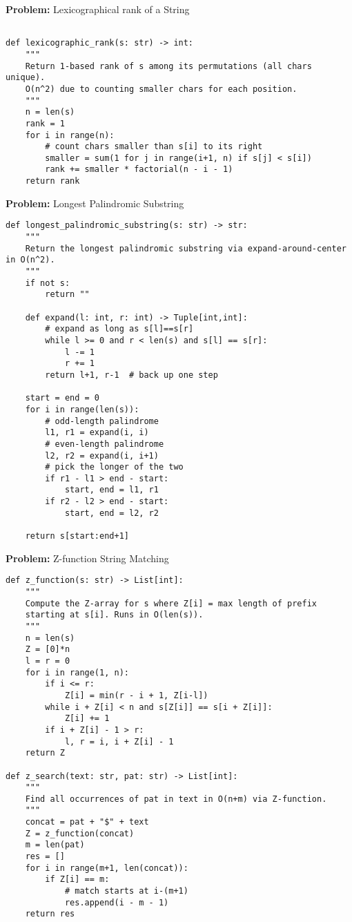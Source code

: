 \noindent\textbf{Problem:} Lexicographical rank of a String
\begin{verbatim}

def lexicographic_rank(s: str) -> int:
    """
    Return 1-based rank of s among its permutations (all chars unique).
    O(n^2) due to counting smaller chars for each position.
    """
    n = len(s)
    rank = 1
    for i in range(n):
        # count chars smaller than s[i] to its right
        smaller = sum(1 for j in range(i+1, n) if s[j] < s[i])
        rank += smaller * factorial(n - i - 1)
    return rank
\end{verbatim}
\noindent\textbf{Problem:} Longest Palindromic Substring
\begin{verbatim}
def longest_palindromic_substring(s: str) -> str:
    """
    Return the longest palindromic substring via expand‐around‐center in O(n^2).
    """
    if not s:
        return ""

    def expand(l: int, r: int) -> Tuple[int,int]:
        # expand as long as s[l]==s[r]
        while l >= 0 and r < len(s) and s[l] == s[r]:
            l -= 1
            r += 1
        return l+1, r-1  # back up one step

    start = end = 0
    for i in range(len(s)):
        # odd-length palindrome
        l1, r1 = expand(i, i)
        # even-length palindrome
        l2, r2 = expand(i, i+1)
        # pick the longer of the two
        if r1 - l1 > end - start:
            start, end = l1, r1
        if r2 - l2 > end - start:
            start, end = l2, r2

    return s[start:end+1]

\end{verbatim}
\noindent\textbf{Problem:} Z-function String Matching
\begin{verbatim}
def z_function(s: str) -> List[int]:
    """
    Compute the Z-array for s where Z[i] = max length of prefix
    starting at s[i]. Runs in O(len(s)).
    """
    n = len(s)
    Z = [0]*n
    l = r = 0
    for i in range(1, n):
        if i <= r:
            Z[i] = min(r - i + 1, Z[i-l])
        while i + Z[i] < n and s[Z[i]] == s[i + Z[i]]:
            Z[i] += 1
        if i + Z[i] - 1 > r:
            l, r = i, i + Z[i] - 1
    return Z

def z_search(text: str, pat: str) -> List[int]:
    """
    Find all occurrences of pat in text in O(n+m) via Z-function.
    """
    concat = pat + "$" + text
    Z = z_function(concat)
    m = len(pat)
    res = []
    for i in range(m+1, len(concat)):
        if Z[i] == m:
            # match starts at i-(m+1)
            res.append(i - m - 1)
    return res
\end{verbatim}
